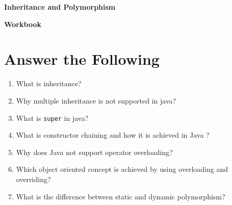 \documentclass[11pt,a4paper]{article}
\def\AnswerBox{\fbox{\begin{minipage}{4in}\hfill\vspace{0.5in}\end{minipage}}}
\begin{document}
\centerline{\huge{ \textbf{Inheritance and Polymorphism}}}

\vspace{1pc}

\centerline{\huge{ \textbf{ Workbook}}}

\section*{Answer the Following}
\begin{enumerate}\itemsep10pt

\item What is inheritance? 

\AnswerBox

\item  Why multiple inheritance is not supported in java?

\AnswerBox

\item  What is \texttt{super} in java?

\AnswerBox

\item  What is constructor chaining and how it is achieved in Java ?

    \AnswerBox
    
\item  Why does Java not support operator overloading?

    \AnswerBox
    
\item   Which object oriented concept is achieved by using overloading and
overriding? \underline{\hspace{2in}}

\item  What is the difference between static and dynamic polymorphism?

    \AnswerBox



   
    \end{enumerate}
\end{document}
